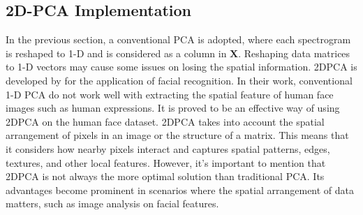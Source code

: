 \documentclass{cta-author}
\begin{document}
\subsection{2D-PCA Implementation}
In the previous section, a conventional PCA is adopted, where each spectrogram is reshaped to 1-D and is considered as a column in $\boldsymbol{X}$. Reshaping data matrices to 1-D vectors may cause some issues on losing the spatial information.
2DPCA is developed by \cite{24} for the application of facial recognition. In their work, conventional 1-D PCA do not work well with extracting the spatial feature of human face images such as human expressions. It is proved to be an effective way of using 2DPCA on the human face dataset.
2DPCA takes into account the spatial arrangement of pixels in an image or the structure of a matrix. This means that it considers how nearby pixels interact and captures spatial patterns, edges, textures, and other local features. However, it's important to mention that 2DPCA is not always the more optimal solution than traditional PCA. Its advantages become prominent in scenarios where the spatial arrangement of data matters, such as image analysis on facial features. 
\end{document}
